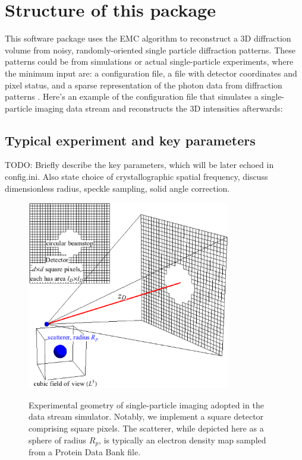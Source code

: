 \documentclass[]{iucr}              %
\begin{document}
\section{Structure of this package}\label{sec:package}
This software package uses the EMC algorithm to reconstruct a 3D diffraction volume from noisy, randomly-oriented single particle diffraction patterns. These patterns could be from simulations or actual single-particle experiments, where the minimum input are: a configuration file, a file with detector coordinates and pixel status, and a sparse representation of the photon data from diffraction patterns . Here's an example of the configuration file that simulates a single-particle imaging data stream and reconstructs the 3D intensities afterwards:


\subsection{Typical experiment and key parameters}\label{sec:expParams}

TODO: Briefly describe the key parameters, which will be later echoed in config.ini. Also state choice of crystallographic spatial frequency, discuss dimensionless radius, speckle sampling, solid angle correction.

\begin{figure}
\caption{Experimental geometry of single-particle imaging adopted in the data stream simulator. Notably, we implement a square detector comprising square pixels. The scatterer, while depicted here as a sphere of radius $R_p$, is typically an electron density map sampled from a Protein Data Bank file.}
\includegraphics[width=3.5in]{figures/geometry.eps} \label{fig:expGeometry}
\end{figure}
\end{document}
